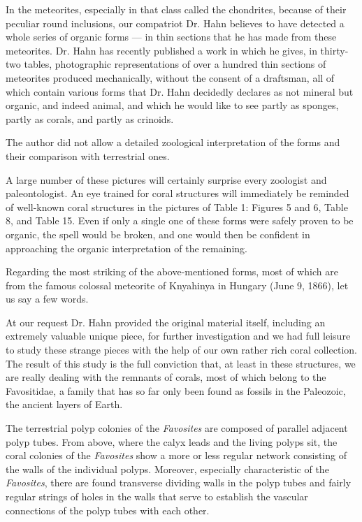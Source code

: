 \documentclass[a4paper, 12pt, oneside]{article}
\begin{document}
In the meteorites, especially in that class called the chondrites, because of their peculiar round inclusions, our compatriot Dr. Hahn believes to have detected a whole series of organic forms --- in thin sections that he has made from these meteorites. Dr. Hahn has recently published a work in which he gives, in thirty-two tables, photographic representations of over a hundred thin sections of meteorites produced mechanically, without the consent of a draftsman, all of which contain various forms that Dr. Hahn decidedly declares as not mineral but organic, and indeed animal, and which he would like to see partly as sponges, partly as corals, and partly as crinoids.

The author did not allow a detailed zoological interpretation of the forms and their comparison with terrestrial ones.

A large number of these pictures will certainly surprise every zoologist and paleontologist. An eye trained for coral structures will immediately be reminded of well-known coral structures in the pictures of Table 1: Figures 5 and 6, Table 8, and Table 15. Even if only a single one of these forms were safely proven to be organic, the spell would be broken, and one would then be confident in approaching the organic interpretation of the remaining.

Regarding the most striking of the above-mentioned forms, most of which are from the famous colossal meteorite of Knyahinya in Hungary (June 9, 1866), let us say a few words.

At our request Dr. Hahn provided the original material itself, including an extremely valuable unique piece, for further investigation and we had full leisure to study these strange pieces with the help of our own rather rich coral collection. The result of this study is the full conviction that, at least in these structures, we are really dealing with the remnants of corals, most of which belong to the Favositidae, a family that has so far only been found as fossils in the Paleozoic, the ancient layers of Earth.

The terrestrial polyp colonies of the \emph{Favosites} are composed of parallel adjacent polyp tubes. From above, where the calyx leads and the living polyps sit, the coral colonies of the \emph{Favosites} show a more or less regular network consisting of the walls of the individual polyps. Moreover, especially characteristic of the \emph{Favosites}, there are found transverse dividing walls in the polyp tubes and fairly regular strings of holes in the walls that serve to establish the vascular connections of the polyp tubes with each other.
\end{document}
